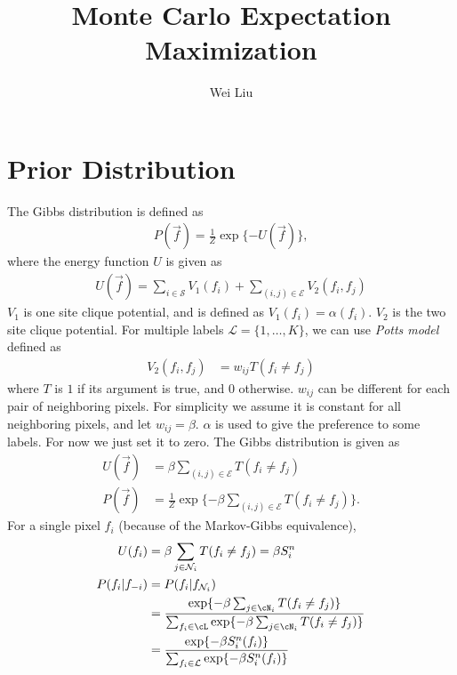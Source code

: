 \documentclass{article}
\begin{document}
\title{Monte Carlo Expectation Maximization}
\author{Wei Liu}
\maketitle
\tableofcontents

\section{Prior Distribution}

The Gibbs distribution is defined as
\begin{align}
  P(\vec f) = \frac{1}{Z} \exp\{-U(\vec f)\},
\end{align}
where the energy function $U$ is given as
\begin{align}
  U(\vec f) = \sum_{i \in \mathcal{S}} V_1 (f_i) + \sum_{(i,j) \in \mathcal{E}} V_2 (f_i, f_j)
\end{align}
$V_1$ is one site clique potential, and is defined as $V_1(f_i) = \alpha(
f_i)$. $V_2$ is the two site clique potential. For multiple labels
$\mathcal{L} = \{1,\dots, K\}$, we can use \emph{Potts model} defined
as
\begin{align}
  V_2 (f_i, f_j) &= w_{ij} T(f_i \neq f_j)
\end{align}
where $T$ is $1$ if its argument is true, and $0$
otherwise\citep{boykov2002fast}. $w_{ij}$ can be different for each
pair of neighboring pixels. For simplicity we assume it is constant
for all neighboring pixels, and let $w_{ij} = \beta$. $\alpha$ is used
to give the preference to some labels. For now we just set it to
zero. The Gibbs distribution is given as
\begin{align}
  U(\vec f) &= \beta \sum_{(i,j) \in \mathcal{E}}T(f_i \neq f_j) \\
  P(\vec f) &= \frac{1}{Z} \exp \{  - \beta \sum_{(i,j) \in \mathcal{E}}T(f_i \neq f_j)\}.
\end{align}
For a single pixel $f_i$ (because of the Markov-Gibbs equivalence),
\begin{align*}
  U(f_i) &= \beta \sum_{j \in \mathcal{N}_i} T(f_i \neq f_j)  = \beta S_i^n\\
  P(f_i | f_{-i} ) &= P(f_i | f_{\mathcal{N}_i}) \\
  &= \frac{\exp\{- \beta \sum_{j\in \cN_i}T(f_i \neq f_j)\}}{\sum_{f_i \in \cL}\exp\{ - \beta \sum_{j\in \cN_i}T(f_i \neq f_j)\}} \\
&=   \frac{\exp \{ -\beta S_i^n(f_i)\}}{\sum_{f_i \in \mathcal{L}} \exp \{ -\beta S_i^n(f_i) \}}
\end{align*}
\end{document}
